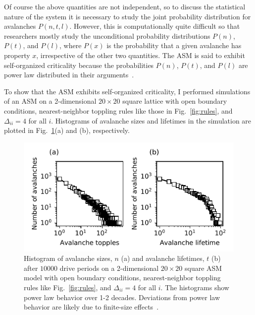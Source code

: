 \documentclass[aps,prb,reprint,superscriptaddress]{revtex4-2}
\begin{document}
Of course the above quantities are not independent, so to discuss the statistical nature of the system it is necessary to study the joint probability distribution for avalanches $P(n, t, l)$. However, this is computationally quite difficult so that researchers mostly study the unconditional probability distributions $P(n)$, $P(t)$, and $P(l)$, where $P(x)$ is the probability that a given avalanche has property $x$, irrespective of the other two quantities. The ASM is said to exhibit self-organized criticality because the probabilities $P(n)$, $P(t)$, and $P(l)$ are power law distributed in their arguments~\cite{jensen}.

To show that the ASM exhibits self-organized criticality, I performed simulations of an ASM on a 2-dimensional $20 \times 20$ square lattice with open boundary conditions, nearest-neighbor toppling rules like those in Fig.~\ref{fig:rules}, and $\Delta_{ii} = 4$ for all $i$. Histograms of avalanche sizes and lifetimes in the simulation are plotted in Fig.~\ref{fig:avalanches}(a) and (b), respectively.

\begin{figure}
\includegraphics{avalanches}
\caption{\label{fig:avalanches}Histogram of avalanche sizes, $n$ (a) and avalanche lifetimes, $t$ (b) after $10000$ drive periods on a 2-dimensional $20 \times 20$ square ASM model with open boundary conditions, nearest-neighbor toppling rules like Fig.~\ref{fig:rules}, and $\Delta_{ii} = 4$ for all $i$. The histograms show power law behavior over 1-2 decades. Deviations from power law behavior are likely due to finite-size effects~\cite{jensen}.}
\end{figure}









\end{document}
